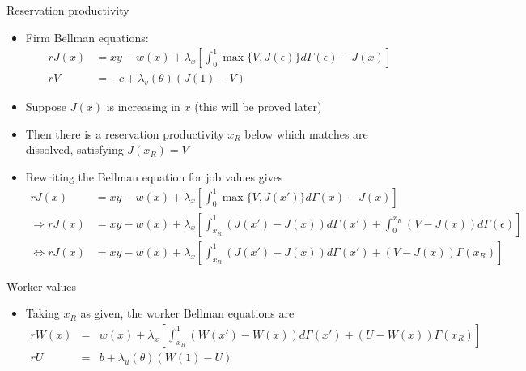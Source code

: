 \documentclass[9pt]{beamer}
\newcommand{\bit}{\begin{itemize}}
\newcommand{\eit}{\end{itemize}}
\begin{document}
\begin{frame}{Reservation productivity}

\bit
\setlength\itemsep{1em}

\item Firm Bellman equations:
\begin{align*}
rJ(x) &= xy - w(x)+\lambda_x \left[ \int_{0}^{1} \max\{V, J(\epsilon)\}d\Gamma (\epsilon) -J(x) \right] \\
rV &= -c +\lambda_v(\theta)\left(J(1)-V\right)
\end{align*}


\item Suppose $J(x)$ is increasing in $x$ (this will be proved later)

\item Then there is a reservation productivity $x_R$ below which matches are dissolved, satisfying $J(x_R)=V$

\item Rewriting the Bellman equation for job values gives
\begin{align*}
rJ(x) &= xy - w(x)+\lambda_x \left[ \int_{0}^{1} \max\{V, J(x')\}d\Gamma (x) -J(x) \right] \\
\Rightarrow rJ(x) &= xy - w(x)+\lambda_x \left[ \int_{x_R}^{1} (J(x')-J(x)) d\Gamma (x') + \int_{0}^{x_R} (V-J(x)) d\Gamma (\epsilon)  \right] \\
\Leftrightarrow rJ(x) &= xy - w(x)+\lambda_x \left[ \int_{x_R}^{1} (J(x')-J(x)) d\Gamma (x') + (V-J(x))\Gamma (x_R)  \right]
\end{align*}

\eit
\end{frame}

\begin{frame}{Worker values}

\bit
\setlength\itemsep{1.5em}

\item Taking $x_R$ as given, the worker Bellman equations are
\begin{eqnarray}
rW(x) &=& w(x)  + \lambda_x \left[ \int_{x_R}^{1} (W(x')-W(x)) d\Gamma (x') + (U-W(x))\Gamma (x_R)  \right] \nonumber \\ 
rU &=& b  + \lambda_u(\theta) \left(W(1)-U\right) \nonumber
\end{eqnarray}

\eit
\end{frame}
\end{document}

